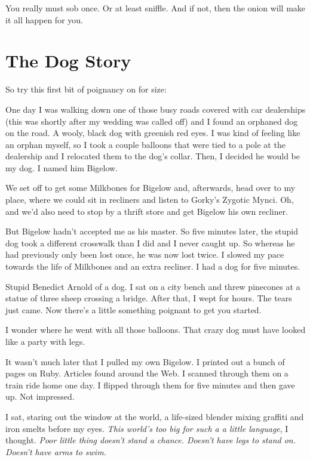 \documentclass[12pt,twoside]{report}
\begin{document}
You really must sob once.  Or at least sniffle.  And if not, then the
onion will make it all happen for you.


\section{The Dog Story}


So try this first bit of poignancy on for size:

One day I was walking down one of those busy roads covered with car
dealerships (this was shortly after my wedding was called off) and I
found an orphaned dog on the road.  A wooly, black dog with greenish
red eyes.  I was kind of feeling like an orphan myself, so I took a
couple balloons that were tied to a pole at the dealership and I
relocated them to the dog's collar.  Then, I decided he would be my
dog.  I named him Bigelow.

We set off to get some Milkbones for Bigelow and, afterwards, head
over to my place, where we could sit in recliners and listen to
Gorky's Zygotic Mynci.  Oh, and we'd also need to stop by a thrift
store and get Bigelow his own recliner.

But Bigelow hadn't accepted me as his master.  So five minutes later,
the stupid dog took a different crosswalk than I did and I never
caught up.  So whereas he had previously only been lost once, he was
now lost twice.  I slowed my pace towards the life of Milkbones and an
extra recliner.  I had a dog for five minutes.

Stupid Benedict Arnold of a dog.  I sat on a city bench and threw
pinecones at a statue of three sheep crossing a bridge.  After that, I
wept for hours.  The tears just came.  Now there's a little something
poignant to get you started.

I wonder where he went with all those balloons.  That crazy dog must
have looked like a party with legs.

It wasn't much later that I pulled my own Bigelow.  I printed out a
bunch of pages on Ruby.  Articles found around the Web.  I scanned
through them on a train ride home one day.  I flipped through them for
five minutes and then gave up.  Not impressed.

I sat, staring out the window at the world, a life-sized blender
mixing graffiti and iron smelts before my eyes.  {\em This world's too
  big for such a a little language}, I thought. {\em Poor little thing
  doesn't stand a chance.  Doesn't have legs to stand on.  Doesn't
  have arms to swim.}
\end{document}
